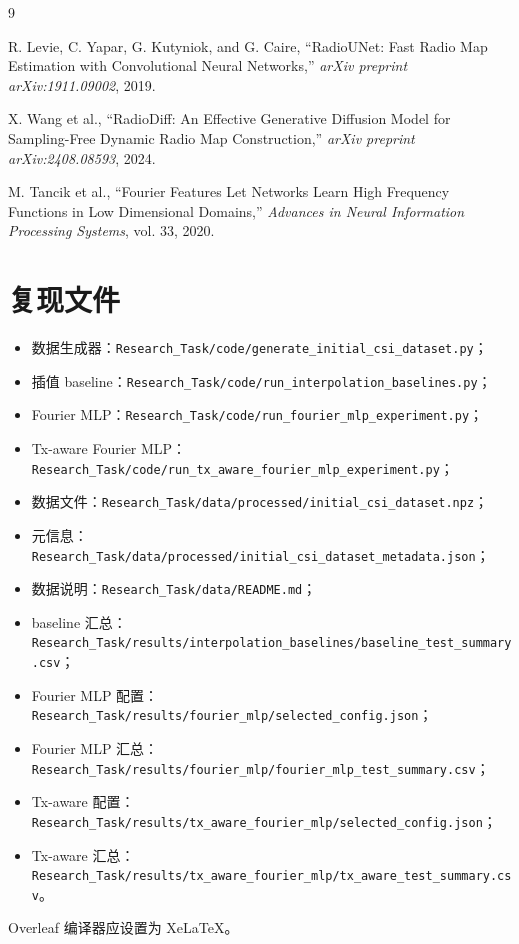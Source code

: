\documentclass[UTF8,a4paper,11pt]{ctexart}
\begin{document}
\begin{thebibliography}{9}

R. Levie, C. Yapar, G. Kutyniok, and G. Caire,
``RadioUNet: Fast Radio Map Estimation with Convolutional Neural Networks,''
\textit{arXiv preprint arXiv:1911.09002}, 2019.

X. Wang et al.,
``RadioDiff: An Effective Generative Diffusion Model for Sampling-Free Dynamic Radio Map Construction,''
\textit{arXiv preprint arXiv:2408.08593}, 2024.

M. Tancik et al.,
``Fourier Features Let Networks Learn High Frequency Functions in Low Dimensional Domains,''
\textit{Advances in Neural Information Processing Systems}, vol. 33, 2020.

\end{thebibliography}

\appendix
\section{复现文件}

\begin{itemize}
    \item 数据生成器：\texttt{Research\_Task/code/generate\_initial\_csi\_dataset.py}；
    \item 插值 baseline：\texttt{Research\_Task/code/run\_interpolation\_baselines.py}；
    \item Fourier MLP：\texttt{Research\_Task/code/run\_fourier\_mlp\_experiment.py}；
    \item Tx-aware Fourier MLP：\texttt{Research\_Task/code/run\_tx\_aware\_fourier\_mlp\_experiment.py}；
    \item 数据文件：\texttt{Research\_Task/data/processed/initial\_csi\_dataset.npz}；
    \item 元信息：\texttt{Research\_Task/data/processed/initial\_csi\_dataset\_metadata.json}；
    \item 数据说明：\texttt{Research\_Task/data/README.md}；
    \item baseline 汇总：\texttt{Research\_Task/results/interpolation\_baselines/baseline\_test\_summary.csv}；
    \item Fourier MLP 配置：\texttt{Research\_Task/results/fourier\_mlp/selected\_config.json}；
    \item Fourier MLP 汇总：\texttt{Research\_Task/results/fourier\_mlp/fourier\_mlp\_test\_summary.csv}；
    \item Tx-aware 配置：\texttt{Research\_Task/results/tx\_aware\_fourier\_mlp/selected\_config.json}；
    \item Tx-aware 汇总：\texttt{Research\_Task/results/tx\_aware\_fourier\_mlp/tx\_aware\_test\_summary.csv}。
\end{itemize}

Overleaf 编译器应设置为 XeLaTeX。
\end{document}
